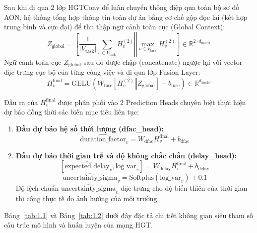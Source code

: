 Sau khi đi qua $2$ lớp HGTConv để luân chuyển thông điệp qua toàn bộ sơ đồ AON, hệ thống tổng hợp thông tin toàn dự án bằng cơ chế gộp đọc lai (kết hợp trung bình và cực đại) để thu thập ngữ cảnh toàn cục (Global Context):
\begin{equation}
    Z_{\text{global}} = \left[ \frac{1}{|V_{\text{task}}|} \sum_{v \in V_{\text{task}}} H_v^{(2)} \mathbin{\Vert} \max_{v \in V_{\text{task}}} H_v^{(2)} \right] \in \mathbb{R}^{2 \cdot d_{\text{model}}}
\end{equation}
Ngữ cảnh toàn cục $Z_{\text{global}}$ sau đó được chập (concatenate) ngược lại với vector đặc trưng cục bộ của từng công việc và đi qua lớp Fusion Layer:
\begin{equation}
    H_v^{\text{final}} = \text{GELU}\left( W_{\text{fuse}} \left[ H_v^{(2)} \mathbin{\Vert} Z_{\text{global}} \right] + b_{\text{fuse}} \right) \in \mathbb{R}^{d_{\text{model}}}
\end{equation}

Đầu ra của $H_v^{\text{final}}$ được phân phối vào 2 Prediction Heads chuyên biệt thực hiện dự báo đồng thời các biến mục tiêu liên tục:
\begin{enumerate}
    \item \textbf{Đầu dự báo hệ số thời lượng (dfac\_head):}
    \begin{equation}
        \widehat{\text{duration\_factor}}_v = W_{\text{dfac}} H_v^{\text{final}} + b_{\text{dfac}}
    \end{equation}
    \item \textbf{Đầu dự báo thời gian trễ và độ không chắc chắn (delay\_head):}
    \begin{equation}
        \left[ \widehat{\text{expected\_delay}}_v, \text{log\_var}_v \right] = W_{\text{delay}} H_v^{\text{final}} + b_{\text{delay}}
    \end{equation}
    \begin{equation}
        \widehat{\text{uncertainty\_sigma}}_v = \text{Softplus}(\text{log\_var}_v) + 0.1
    \end{equation}
    Độ lệch chuẩn $\widehat{\text{uncertainty\_sigma}}_v$ đặc trưng cho độ biến thiên của thời gian thi công thực tế do ảnh hưởng của môi trường.
\end{enumerate}

Bảng~\ref{tab:1.1} và Bảng~\ref{tab:1.2} dưới đây đặc tả chi tiết không gian siêu tham số cấu trúc mô hình và huấn luyện của mạng HGT.

